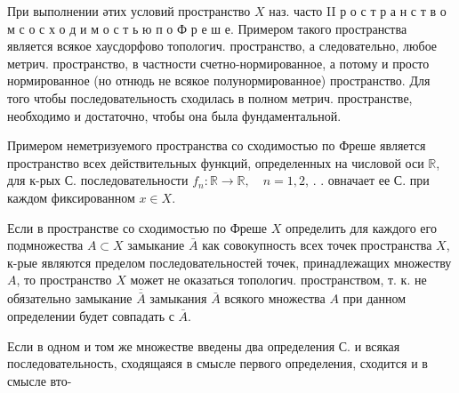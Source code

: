 \documentclass[10pt]{article}
\begin{document}
При выполнении әтих условий пространство $X$ наз. часто II р о с т р а н с т в о м с о с х о д и м о с т ь ю п о Ф р е ш е. Примером такого пространства является всякое хаусдорфово топологич. пространство, а следовательно, любое метрич. пространство, в частности счетно-нормированное, а потому и просто нормированное (но отнюдь не всякое полунормированное) пространство. Для того чтобы последовательность сходилась в полном метрич. пространстве, необходимо и достаточно, чтобы она была фундаментальной.



Примером неметризуемого пространства со сходимостью по Фреше является пространство всех действительных функций, определенных на числовой оси $\mathbb{R}$, для к-рых С. последовательности $f_{n}: \mathbb{R} \rightarrow \mathbb{R}, \quad n=1,2$, . . овначает ее С. при каждом фиксированном $x \in X$.



Если в пространстве со сходимостью по Фреше $X$ определить для каждого его подмножества $A \subset X$ замыкание $\bar{A}$ как совокупность всех точек пространства $X$, к-рые являются пределом последовательностей точек, принадлежащих множеству $A$, то пространство $X$ может не оказаться топологич. пространством, т. к. не обязательно замыкание $\overline{\bar{A}}$ замыкания $\bar{A}$ всякого множества $A$ при данном определении будет совпадать с $\bar{A}$.



Если в одном и том же множестве введены два определения С. и всякая последовательность, сходящаяся в смысле первого определения, сходится и в смысле вто-
\end{document}
